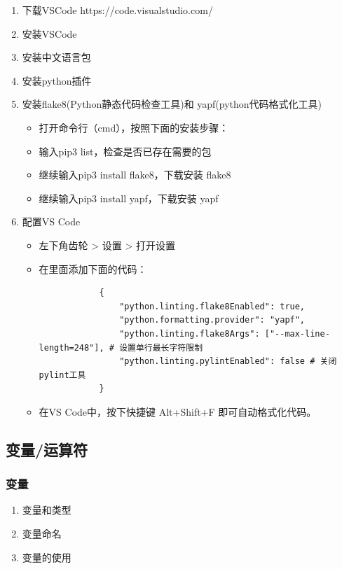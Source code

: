 \documentclass[10pt]{elegantnote}
\begin{document}
\begin{sloppypar}
    \begin{enumerate}
      \item 下载VSCode https://code.visualstudio.com/
      \item 安装VSCode
      \item 安装中文语言包
      \item 安装python插件
      \item 安装flake8(Python静态代码检查工具)和 yapf(python代码格式化工具)
        \begin{itemize}
          \item 打开命令行（cmd），按照下面的安装步骤：
          \item 输入pip3 list，检查是否已存在需要的包
          \item 继续输入pip3 install flake8，下载安装 flake8
          \item 继续输入pip3 install yapf，下载安装 yapf
        \end{itemize}
      \item 配置VS Code
        \begin{itemize}
          \item 左下角齿轮 > 设置 > 打开设置
          \item 在里面添加下面的代码：
          
          \begin{lstlisting}
            {
                "python.linting.flake8Enabled": true,
                "python.formatting.provider": "yapf",
                "python.linting.flake8Args": ["--max-line-length=248"], # 设置单行最长字符限制
                "python.linting.pylintEnabled": false # 关闭pylint工具
            }
          \end{lstlisting}
          \item 在VS Code中，按下快捷键 Alt+Shift+F 即可自动格式化代码。
        \end{itemize}
    \end{enumerate}

\subsection{变量/运算符}
\subsubsection{变量}
\begin{enumerate}
  \item 变量和类型
  \item 变量命名
  \item 变量的使用
\end{enumerate}

\end{sloppypar}
\end{document}
